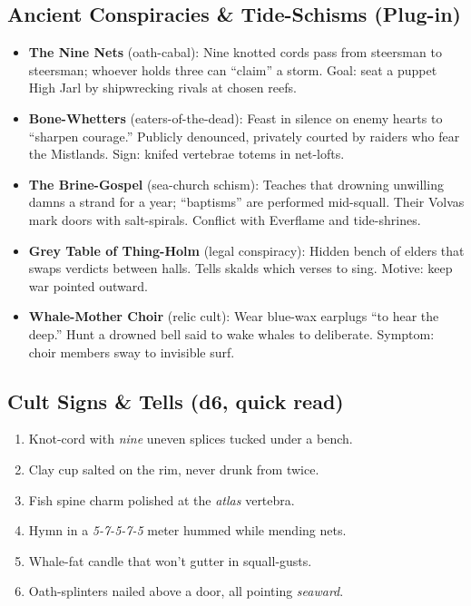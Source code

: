\subsection*{Ancient Conspiracies \& Tide-Schisms (Plug-in)}
\begin{itemize}
  \item \textbf{The Nine Nets} (oath-cabal): Nine knotted cords pass from steersman to steersman; whoever holds three can “claim” a storm. Goal: seat a puppet High Jarl by shipwrecking rivals at chosen reefs.
  \item \textbf{Bone-Whetters} (eaters-of-the-dead): Feast in silence on enemy hearts to “sharpen courage.” Publicly denounced, privately courted by raiders who fear the Mistlands. Sign: knifed vertebrae totems in net-lofts.
  \item \textbf{The Brine-Gospel} (sea-church schism): Teaches that drowning unwilling damns a strand for a year; “baptisms” are performed mid-squall. Their Volvas mark doors with salt-spirals. Conflict with Everflame and tide-shrines.
  \item \textbf{Grey Table of Thing-Holm} (legal conspiracy): Hidden bench of elders that swaps verdicts between halls. Tells skalds which verses to sing. Motive: keep war pointed outward.
  \item \textbf{Whale-Mother Choir} (relic cult): Wear blue-wax earplugs “to hear the deep.” Hunt a drowned bell said to wake whales to deliberate. Symptom: choir members sway to invisible surf.
\end{itemize}

\subsection*{Cult Signs \& Tells (d6, quick read)}
\begin{enumerate}
  \item Knot-cord with \emph{nine} uneven splices tucked under a bench.
  \item Clay cup salted on the rim, never drunk from twice.
  \item Fish spine charm polished at the \emph{atlas} vertebra.
  \item Hymn in a \emph{5-7-5-7-5} meter hummed while mending nets.
  \item Whale-fat candle that won’t gutter in squall-gusts.
  \item Oath-splinters nailed above a door, all pointing \emph{seaward}.
\end{enumerate}

